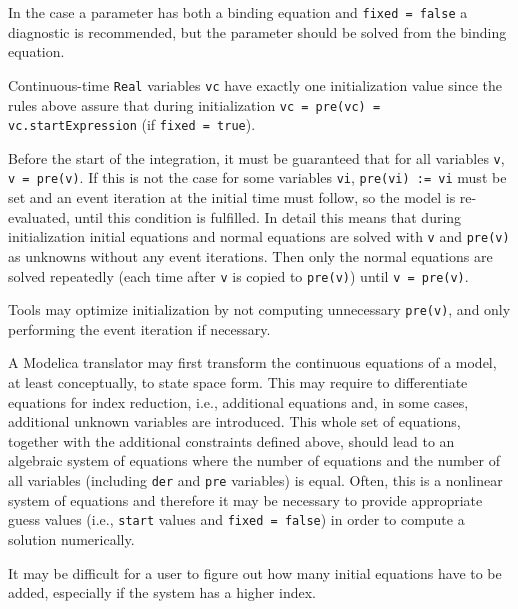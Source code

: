 \begin{nonnormative}
In the case a parameter has both a binding equation and \lstinline!fixed = false! a diagnostic is recommended, but the parameter should be solved from the binding equation.

Continuous-time \lstinline!Real! variables \lstinline!vc! have exactly one initialization value since the rules above assure that during initialization \lstinline!vc = pre(vc) = vc.startExpression! (if \lstinline!fixed = true!).

Before the start of the integration, it must be guaranteed that for all variables \lstinline!v!, \lstinline!v = pre(v)!.
If this is not the case for some variables \lstinline!vi!, \lstinline!pre(vi) := vi! must be set and an event iteration at the initial time must follow, so the model is re-evaluated, until this condition is fulfilled.
In detail this means that during initialization initial equations and normal equations are solved with \lstinline!v! and \lstinline!pre(v)! as unknowns without any event iterations.
Then only the normal equations are solved repeatedly (each time after \lstinline!v! is copied to \lstinline!pre(v)!) until \lstinline!v = pre(v)!.

\begin{nonnormative}
Tools may optimize initialization by not computing unnecessary \lstinline!pre(v)!, and only performing the event iteration if necessary.
\end{nonnormative}

A Modelica translator may first transform the continuous equations of a model, at least conceptually, to state space form.
This may require to differentiate equations for index reduction, i.e., additional equations and, in some cases, additional unknown variables are introduced.
This whole set of equations, together with the additional constraints defined above, should lead to an algebraic system of equations where the number of equations and the number of all variables (including \lstinline!der! and \lstinline!pre! variables) is equal.
Often, this is a nonlinear system of equations and therefore it may be necessary to provide appropriate guess values (i.e., \lstinline!start! values and \lstinline!fixed = false!) in order to compute a solution numerically.

It may be difficult for a user to figure out how many initial equations have to be added, especially if the system has a higher index.
\end{nonnormative}

